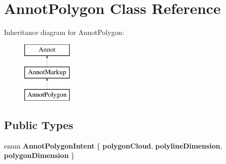 \hypertarget{class_annot_polygon}{}\section{Annot\+Polygon Class Reference}
\label{class_annot_polygon}
Inheritance diagram for Annot\+Polygon\+:\begin{figure}[H]
\begin{center}
\leavevmode
\includegraphics[height=3.000000cm]{class_annot_polygon}
\end{center}
\end{figure}
\subsection*{Public Types}
\begin{DoxyCompactItemize}
\item 
\mbox{\label{class_annot_polygon_ae568338c3f771c90097fbaed193f639f}} 
enum {\bfseries Annot\+Polygon\+Intent} \{ {\bfseries polygon\+Cloud}, 
{\bfseries polyline\+Dimension}, 
{\bfseries polygon\+Dimension}
 \}
\end{DoxyCompactItemize}
